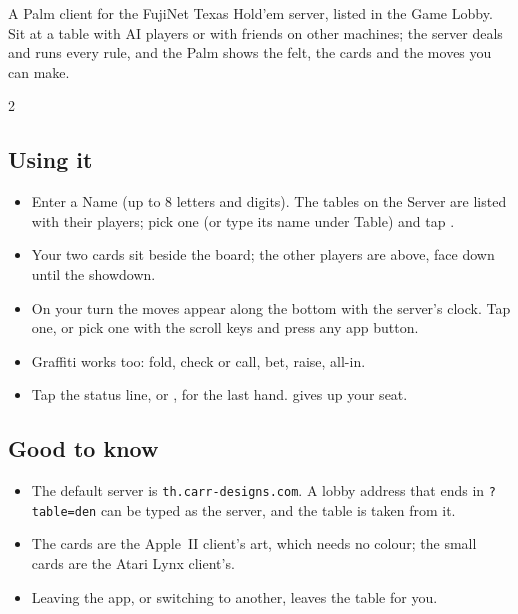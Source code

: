 A Palm client for the FujiNet Texas Hold'em server, listed in the Game Lobby.
Sit at a table with AI players or with friends on other machines; the server
deals and runs every rule, and the Palm shows the felt, the cards and the
moves you can make.

\begin{center}
\hfill
{}\hfill
{}
\end{center}

\begin{multicols}{2}
\subsection*{Using it}
\begin{itemize}
  \item Enter a \textsf{Name} (up to 8 letters and digits). The tables on the
    \textsf{Server} are listed with their players; pick one (or type its name
    under \textsf{Table}) and tap .
  \item Your two cards sit beside the board; the other players are above, face
    down until the showdown.
  \item On your turn the moves appear along the bottom with the server's
    clock. Tap one, or pick one with the scroll keys and press any app button.
  \item Graffiti works too:  fold,  check or call,  bet,
     raise,  all-in.
  \item Tap the status line, or , for the last
    hand.  gives up your seat.
\end{itemize}

\subsection*{Good to know}
\begin{itemize}
  \item The default server is \texttt{th.carr-designs.com}. A lobby address
    that ends in \texttt{?table=den} can be typed as the server, and the table
    is taken from it.
  \item The cards are the Apple~II client's art, which needs no colour; the
    small cards are the Atari Lynx client's.
  \item Leaving the app, or switching to another, leaves the table for you.
\end{itemize}
\end{multicols}

